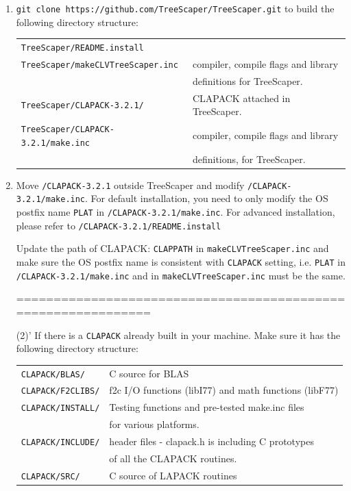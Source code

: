 \documentclass[11pt]{article}
\begin{document}
	\begin{enumerate}[(1)]
		\item \texttt{git clone https://github.com/TreeScaper/TreeScaper.git} to build 
		the following directory structure:
		
		\begin{table}[!h]
			\begin{tabular}{ll}
				\texttt{TreeScaper/README.install}           &\\

				\texttt{TreeScaper/makeCLVTreeScaper.inc}    &compiler, compile flags and library\\ 
				&definitions for TreeScaper.\\
				\texttt{TreeScaper/CLAPACK-3.2.1/}           &CLAPACK attached in TreeScaper.\\
				\texttt{TreeScaper/CLAPACK-3.2.1/make.inc}   &compiler, compile flags and library\\
				&definitions, for TreeScaper.\\
			\end{tabular}
		\end{table} 
		
		
		\item Move \texttt{/CLAPACK-3.2.1} outside TreeScaper and modify 
		\texttt{/CLAPACK-3.2.1/make.inc}.
		For default installation, you need to only modify the OS postfix name
		\texttt{PLAT} in \texttt{/CLAPACK-3.2.1/make.inc}.
		For advanced installation, please refer to \texttt{/CLAPACK-3.2.1/README.install}
		
		Update the path of CLAPACK:
		\texttt{CLAPPATH} in \texttt{makeCLVTreeScaper.inc}
		and make sure the OS postfix name is consistent with \texttt{CLAPACK} setting,
		i.e. \texttt{PLAT} in \texttt{/CLAPACK-3.2.1/make.inc} and in \texttt{makeCLVTreeScaper.inc}
		must be the same.
		
		==============================================================
		
		(2)' If there is a \texttt{CLAPACK} already built in your machine. Make sure it has
		the following directory structure:
		
		\begin{table}[!h]
			\begin{tabular}{ll}
				\texttt{CLAPACK/BLAS/}       &C source for BLAS\\
				\texttt{CLAPACK/F2CLIBS/}    &f2c I/O functions (libI77) and math functions (libF77)\\
				\texttt{CLAPACK/INSTALL/}    &Testing functions and pre-tested make.inc files\\
				&for various platforms.\\
				\texttt{CLAPACK/INCLUDE/}    &header files - clapack.h is including C prototypes \\
				&of all the CLAPACK routines.\\
				\texttt{CLAPACK/SRC/}        &C source of LAPACK routines\\
			\end{tabular}
		\end{table} 
		

\end{enumerate}
\end{document}
